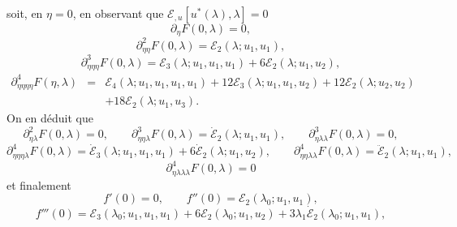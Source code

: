 \documentclass{article}
\newcommand{\nocomma}{}
\begin{document}
soit, en $\eta = 0$, en observant que $\mathcal{E}_{, u} [u^{\ast} (\lambda),
\lambda] = 0$
\begin{equation}
  \partial_{\eta} F (0, \lambda) = 0,
\end{equation}
\begin{equation}
  \partial_{\eta \nocomma \eta}^2 F (0, \lambda) =\mathcal{E}_2 (\lambda ;
  u_1, u_1),
\end{equation}
\begin{equation}
  \partial_{\eta \nocomma \eta \nocomma \eta}^3 F (0, \lambda) =\mathcal{E}_3
  (\lambda ; u_1, u_1, u_1) + 6\mathcal{E}_2 (\lambda ; u_1, u_2),
\end{equation}
\begin{eqnarray}
  \partial_{\eta \nocomma \eta \nocomma \eta \nocomma \eta}^4 F (\eta,
  \lambda) & = & \mathcal{E}_4 (\lambda ; u_1, u_1, u_1, u_1) +
  12\mathcal{E}_3 (\lambda ; u_1, u_1, u_2) + 12\mathcal{E}_2 (\lambda ; u_2,
  u_2) \nonumber\\
  &  & + 18\mathcal{E}_2 (\lambda ; u_1, u_3) .
\end{eqnarray}
On en d{\'e}duit que
\begin{equation}
  \partial_{\eta \nocomma \lambda}^2 F (0, \lambda) = 0, \qquad \partial_{\eta
  \nocomma \eta \nocomma \lambda}^3 F (0, \lambda) = \dot{\mathcal{E}}_2
  (\lambda ; u_1, u_1), \qquad \partial_{\eta \nocomma \lambda \nocomma
  \lambda}^3 F (0, \lambda) = 0,
\end{equation}
\begin{equation}
  \partial_{\eta \nocomma \eta \nocomma \eta \nocomma \lambda}^4 F (0,
  \lambda) = \dot{\mathcal{E}}_3 (\lambda ; u_1, u_1, u_1) + 6
  \dot{\mathcal{E}}_2 (\lambda ; u_1, u_2), \qquad \partial_{\eta \nocomma
  \eta \nocomma \lambda \nocomma \lambda}^4 F (0, \lambda) =
  \ddot{\mathcal{E}}_2 (\lambda ; u_1, u_1),
\end{equation}
\begin{equation}
  \partial_{\eta \nocomma \lambda \nocomma \lambda \nocomma \lambda}^4 F (0,
  \lambda) = 0
\end{equation}
et finalement
\begin{equation}
  f' (0) = 0, \qquad f'' (0) =\mathcal{E}_2 (\lambda_0 ; u_1, u_1),
\end{equation}
\begin{equation}
  f''' (0) =\mathcal{E}_3 (\lambda_0 ; u_1, u_1, u_1) + 6\mathcal{E}_2
  (\lambda_0 ; u_1, u_2) + 3 \lambda_1  \dot{\mathcal{E}}_2 (\lambda_0 ; u_1,
  u_1),
\end{equation}
\end{document}
